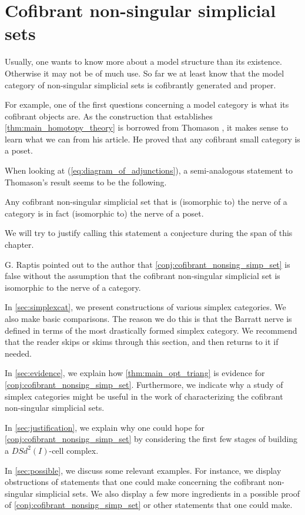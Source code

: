 \chapter{Cofibrant non-singular simplicial sets}
\label{ch:sixth}

Usually, one wants to know more about a model structure than its existence. Otherwise it may not be of much use. So far we at least know that the model category of non-singular simplicial sets is cofibrantly generated and proper.

For example, one of the first questions concerning a model category is what its cofibrant objects are. As the construction that establishes \cref{thm:main_homotopy_theory} is borrowed from Thomason \cite{Th80}, it makes sense to learn what we can from his article. He proved that any cofibrant small category is a poset.

When looking at (\ref{eq:diagram_of_adjunctions}), a semi-analogous statement to Thomason's result seems to be the following.
\begin{conjecture}\label{conj:cofibrant_nonsing_simp_set}
Any cofibrant non-singular simplicial set that is (isomorphic to) the nerve of a category is in fact (isomorphic to) the nerve of a poset.
\end{conjecture}
\noindent We will try to justify calling this statement a conjecture during the span of this chapter.

G. Raptis pointed out to the author that \cref{conj:cofibrant_nonsing_simp_set} is false without the assumption that the cofibrant non-singular simplicial set is isomorphic to the nerve of a category.

In \cref{sec:simplexcat}, we present constructions of various simplex categories. We also make basic comparisons. The reason we do this is that the Barratt nerve is defined in terms of the most drastically formed simplex category. We recommend that the reader skips or skims through this section, and then returns to it if needed.

In \cref{sec:evidence}, we explain how \cref{thm:main_opt_triang} is evidence for \cref{conj:cofibrant_nonsing_simp_set}. Furthermore, we indicate why a study of simplex categories might be useful in the work of characterizing the cofibrant non-singular simplicial sets.

In \cref{sec:justification}, we explain why one could hope for \cref{conj:cofibrant_nonsing_simp_set} by considering the first few stages of building a $DSd^2(I)$-cell complex.

In \cref{sec:possible}, we discuss some relevant examples. For instance, we display obstructions of statements that one could make concerning the cofibrant non-singular simplicial sets. We also display a few more ingredients in a possible proof of \cref{conj:cofibrant_nonsing_simp_set} or other statements that one could make.












